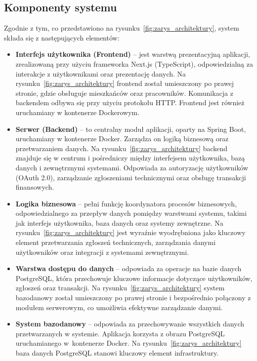 \subsection{Komponenty systemu}
Zgodnie z tym, co przedstawiono na rysunku~\ref{fig:zarys_architektury}, system składa się z następujących elementów: 
\begin{itemize}

    \item \textbf{Interfejs użytkownika (Frontend)} -- jest warstwą prezentacyjną aplikacji, zrealizowaną przy użyciu frameworka Next.js (TypeScript), odpowiedzialną za interakcje z użytkownikami oraz prezentację danych. Na rysunku~\ref{fig:zarys_architektury} frontend został umieszczony po prawej stronie, gdzie obsługuje mieszkańców oraz pracowników. Komunikacja z backendem odbywa się przy użyciu protokołu HTTP. Frontend jest również uruchamiany w kontenerze Dockerowym.

    \item \textbf{Serwer (Backend)} -- to centralny moduł aplikacji, oparty na Spring Boot, uruchamiany w kontenerze Docker. Zarządza on logiką biznesową oraz przetwarzaniem danych. Na rysunku~\ref{fig:zarys_architektury} backend znajduje się w centrum i pośredniczy między interfejsem użytkownika, bazą danych i zewnętrznymi systemami. Odpowiada za autoryzację użytkowników (OAuth 2.0), zarządzanie zgłoszeniami technicznymi oraz obsługę transakcji finansowych. 

    \item \textbf{Logika biznesowa} -- pełni funkcję koordynatora procesów biznesowych, odpowiedzialnego za przepływ danych pomiędzy warstwami systemu, takimi jak interfejs użytkownika, baza danych oraz systemy zewnętrzne. Na rysunku~\ref{fig:zarys_architektury} jest wyraźnie wyodrębniona jako kluczowy element przetwarzania zgłoszeń technicznych, zarządzania danymi użytkowników oraz integracji z systemami zewnętrznymi.

    \item \textbf{Warstwa dostępu do danych} -- odpowiada za operacje na bazie danych PostgreSQL, która przechowuje kluczowe informacje dotyczące użytkowników, zgłoszeń oraz transakcji. Na rysunku~\ref{fig:zarys_architektury} system bazodanowy został umieszczony po prawej stronie i bezpośrednio połączony z modułem serwerowym, co umożliwia efektywne zarządzanie danymi.

    \item \textbf{System bazodanowy} --  odpowiada za przechowywanie wszystkich danych przetwarzanych w systemie. Aplikacja korzysta z obrazu PostgreSQL uruchamianego w~kontenerze Docker. Na rysunku~\ref{fig:zarys_architektury} baza danych PostgreSQL stanowi kluczowy element infrastruktury. 


\end{itemize}
